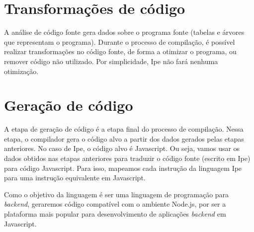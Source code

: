 \section{Transformações de código}

A análise de código fonte gera dados sobre o programa fonte (tabelas e árvores que
representam o programa). Durante o processo de compilação, é possível realizar
transformações no código fonte, de forma a otimizar o programa, ou remover código
não utilizado. Por simplicidade, Ipe não fará nenhuma otimização.


\section{Geração de código}

A etapa de geração de código é a etapa final do processo de compilação. Nessa
etapa, o compilador gera o código alvo a partir dos dados gerados pelas etapas
anteriores. No caso de Ipe, o código alvo é Javascript. Ou seja, vamos usar os dados
obtidos nas etapas anteriores para traduzir o código fonte (escrito em Ipe) para
código Javascript. Para isso, mapeamos cada instrução da linguagem Ipe para uma
instrução equivalente em Javascript.

Como o objetivo da linguagem é ser uma linguagem de programação para \textit{backend},
geraremos código compatível com o ambiente Node.js, por ser a plataforma mais popular
para desenvolvimento de aplicações \textit{backend} em Javascript.
